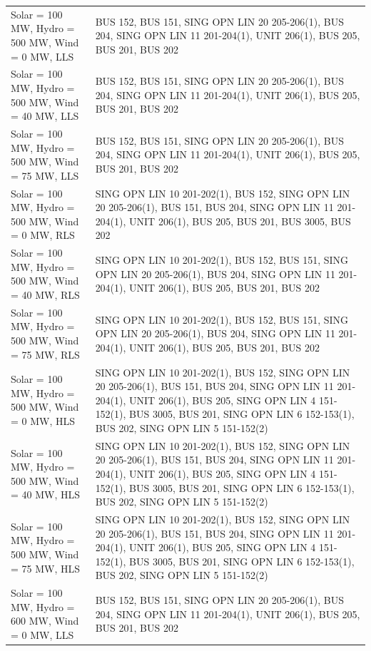 \documentclass[10pt]{report}
\begin{document}
\begin{table}[H]
{\begin{tabular}{lp{17cm}}
Solar = 100 MW, Hydro = 500 MW, Wind = 0 MW, LLS & BUS 152, BUS 151, SING OPN LIN   20 205-206(1), BUS 204, SING OPN LIN   11 201-204(1), UNIT 206(1), BUS 205, BUS 201, BUS 202 \\
Solar = 100 MW, Hydro = 500 MW, Wind = 40 MW, LLS & BUS 152, BUS 151, SING OPN LIN   20 205-206(1), BUS 204, SING OPN LIN   11 201-204(1), UNIT 206(1), BUS 205, BUS 201, BUS 202 \\
Solar = 100 MW, Hydro = 500 MW, Wind = 75 MW, LLS & BUS 152, BUS 151, SING OPN LIN   20 205-206(1), BUS 204, SING OPN LIN   11 201-204(1), UNIT 206(1), BUS 205, BUS 201, BUS 202 \\
Solar = 100 MW, Hydro = 500 MW, Wind = 0 MW, RLS & SING OPN LIN   10 201-202(1), BUS 152, SING OPN LIN   20 205-206(1), BUS 151, BUS 204, SING OPN LIN   11 201-204(1), UNIT 206(1), BUS 205, BUS 201, BUS 3005, BUS 202 \\
Solar = 100 MW, Hydro = 500 MW, Wind = 40 MW, RLS & SING OPN LIN   10 201-202(1), BUS 152, BUS 151, SING OPN LIN   20 205-206(1), BUS 204, SING OPN LIN   11 201-204(1), UNIT 206(1), BUS 205, BUS 201, BUS 202 \\
Solar = 100 MW, Hydro = 500 MW, Wind = 75 MW, RLS & SING OPN LIN   10 201-202(1), BUS 152, BUS 151, SING OPN LIN   20 205-206(1), BUS 204, SING OPN LIN   11 201-204(1), UNIT 206(1), BUS 205, BUS 201, BUS 202 \\
Solar = 100 MW, Hydro = 500 MW, Wind = 0 MW, HLS & SING OPN LIN   10 201-202(1), BUS 152, SING OPN LIN   20 205-206(1), BUS 151, BUS 204, SING OPN LIN   11 201-204(1), UNIT 206(1), BUS 205, SING OPN LIN   4 151-152(1), BUS 3005, BUS 201, SING OPN LIN   6 152-153(1), BUS 202, SING OPN LIN   5 151-152(2) \\
Solar = 100 MW, Hydro = 500 MW, Wind = 40 MW, HLS & SING OPN LIN   10 201-202(1), BUS 152, SING OPN LIN   20 205-206(1), BUS 151, BUS 204, SING OPN LIN   11 201-204(1), UNIT 206(1), BUS 205, SING OPN LIN   4 151-152(1), BUS 3005, BUS 201, SING OPN LIN   6 152-153(1), BUS 202, SING OPN LIN   5 151-152(2) \\
Solar = 100 MW, Hydro = 500 MW, Wind = 75 MW, HLS & SING OPN LIN   10 201-202(1), BUS 152, SING OPN LIN   20 205-206(1), BUS 151, BUS 204, SING OPN LIN   11 201-204(1), UNIT 206(1), BUS 205, SING OPN LIN   4 151-152(1), BUS 3005, BUS 201, SING OPN LIN   6 152-153(1), BUS 202, SING OPN LIN   5 151-152(2) \\
Solar = 100 MW, Hydro = 600 MW, Wind = 0 MW, LLS & BUS 152, BUS 151, SING OPN LIN   20 205-206(1), BUS 204, SING OPN LIN   11 201-204(1), UNIT 206(1), BUS 205, BUS 201, BUS 202 \\

\end{tabular}}
\end{table}
\end{document}
